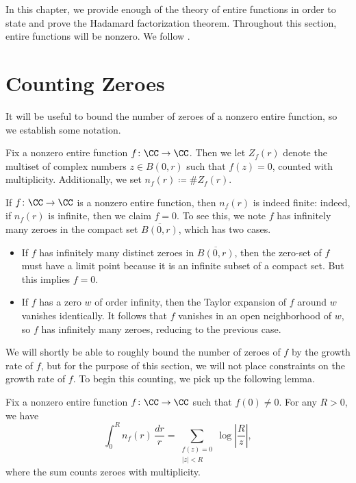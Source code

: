 \documentclass[notes.tex]{subfiles}
\begin{document}
In this chapter, we provide enough of the theory of entire functions in order to state and prove the Hadamard factorization theorem. Throughout this section, entire functions will be nonzero. We follow \cite[Chapter~5]{stein-complex-analysis}.

\section{Counting Zeroes}
It will be useful to bound the number of zeroes of a nonzero entire function, so we establish some notation.
\begin{notation}
	Fix a nonzero entire function $f\colon\CC\to\CC$. Then we let $Z_f(r)$ denote the multiset of complex numbers $z\in B(0,r)$ such that $f(z)=0$, counted with multiplicity. Additionally, we set $n_f(r)\coloneqq\#Z_f(r)$.
\end{notation}
\begin{remark} \label{rem:only-finite-zeroes}
	If $f\colon\CC\to\CC$ is a nonzero entire function, then $n_f(r)$ is indeed finite: indeed, if $n_f(r)$ is infinite, then we claim $f=0$. To see this, we note $f$ has infinitely many zeroes in the compact set $\overline{B(0,r)}$, which has two cases.
	\begin{itemize}
		\item If $f$ has infinitely many distinct zeroes in $\overline{B(0,r)}$, then the zero-set of $f$ must have a limit point because it is an infinite subset of a compact set. But this implies $f=0$.
		\item If $f$ has a zero $w$ of order infinity, then the Taylor expansion of $f$ around $w$ vanishes identically. It follows that $f$ vanishes in an open neighborhood of $w$, so $f$ has infinitely many zeroes, reducing to the previous case.
	\end{itemize}
\end{remark}
We will shortly be able to roughly bound the number of zeroes of $f$ by the growth rate of $f$, but for the purpose of this section, we will not place constraints on the growth rate of $f$. To begin this counting, we pick up the following lemma.
\begin{lemma} \label{lem:int-over-zeroes}
	Fix a nonzero entire function $f\colon\CC\to\CC$ such that $f(0)\ne0$. For any $R>0$, we have
	\[\int_0^Rn_f(r)\,\frac{dr}r=\sum_{\substack{f(z)=0\\|z|<R}}\log\left|\frac Rz\right|,\]
	where the sum counts zeroes with multiplicity.
\end{lemma}
\end{document}

